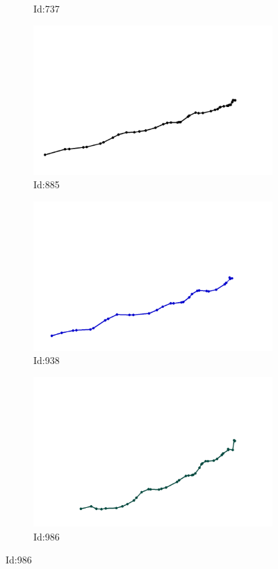 \documentclass[12pt,twoside]{report}
\begin{document}
\begin{figure}
\begin{subfigure}[b]{0.20\textwidth}
\caption{Id:737}
\end{subfigure}
\begin{subfigure}[b]{0.20\textwidth}
\centering
\includegraphics[width=\textwidth]{../../trajectories/885.png}
\caption{Id:885}
\end{subfigure}
\begin{subfigure}[b]{0.20\textwidth}
\centering
\includegraphics[width=\textwidth]{../../trajectories/938.png}
\caption{Id:938}
\end{subfigure}
\begin{subfigure}[b]{0.20\textwidth}
\centering
\includegraphics[width=\textwidth]{../../trajectories/986.png}
\caption{Id:986}
\end{subfigure}
\end{figure}
\end{document}

